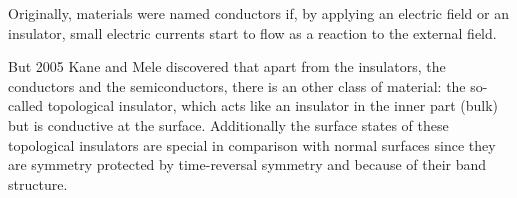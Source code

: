 %
%
%	
	Originally, materials were named conductors if, by applying an electric field or an insulator, small electric currents start to flow as a reaction to the external field. 
	
	But 2005 Kane and Mele \cite{Kane_Mele1} discovered that apart from the insulators, the conductors and the semiconductors, there is an other class of material: the so-called topological insulator, which acts like an insulator in the inner part (bulk) but is conductive at the surface. 
	Additionally the surface states of these topological insulators are special in comparison with normal surfaces since they are symmetry protected by time-reversal symmetry and because of their band structure. 
	
